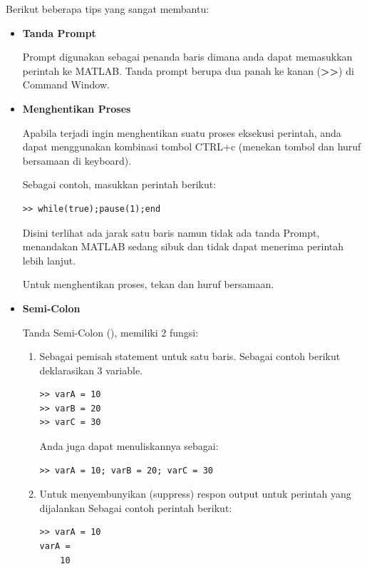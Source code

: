 \documentclass[12pt]{book}
\begin{document}
	Berikut beberapa tips yang sangat membantu:
	
	\begin{itemize}
		\item \textbf{Tanda Prompt}
		
		Prompt digunakan sebagai penanda baris dimana anda dapat memasukkan perintah ke MATLAB.
		Tanda prompt berupa dua panah ke kanan (\textbf{>>}) di Command Window.
		
		\item \textbf{Menghentikan Proses}
		
		Apabila terjadi ingin menghentikan suatu proses eksekusi perintah,
		anda dapat menggunakan kombinasi tombol CTRL+c (menekan tombol  dan huruf  bersamaan di keyboard).
	
		Sebagai contoh, masukkan perintah berikut:
		\begin{verbatim}
>> while(true);pause(1);end
		\end{verbatim}
		
		Disini terlihat ada jarak satu baris namun tidak ada tanda Prompt,
		menandakan MATLAB sedang sibuk dan tidak dapat menerima perintah lebih lanjut.
		
		Untuk menghentikan proses, tekan  dan huruf  bersamaan.
		
		\item \textbf{Semi-Colon}
		
		Tanda Semi-Colon (\keys{;}), memiliki 2 fungsi:
		\begin{enumerate}
			\item Sebagai pemisah statement untuk satu baris.
			Sebagai contoh berikut deklarasikan 3 variable.
			\begin{verbatim}
>> varA = 10
>> varB = 20
>> varC = 30
			\end{verbatim}
		
			Anda juga dapat menuliskannya sebagai:
			\begin{verbatim}
>> varA = 10; varB = 20; varC = 30
			\end{verbatim}
		
			\item Untuk menyembunyikan (suppress) respon output untuk perintah yang dijalankan
			Sebagai contoh perintah berikut:
			\begin{verbatim}
>> varA = 10
varA =
	10
			\end{verbatim}
		

\end{enumerate}
\end{itemize}
\end{document}
